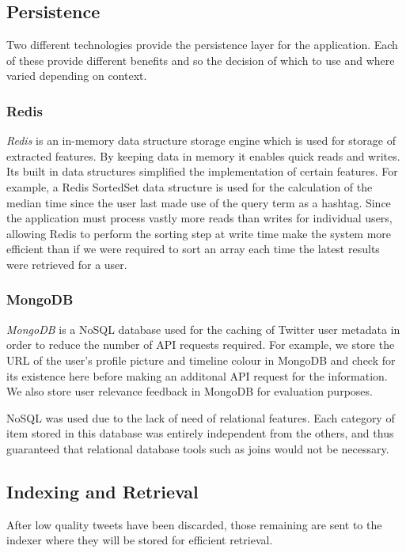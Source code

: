 \documentclass{l4proj}
\begin{document}
        \subsection{Persistence}
        
        Two different technologies provide the persistence layer for the application. Each of these provide different benefits and so the decision of which to use and where varied depending on context.
        
        \subsubsection{Redis}
        \textit{Redis} is an in-memory data structure storage engine which is used for storage of extracted features. By keeping data in memory it enables quick reads and writes. Its built in data structures simplified the implementation of certain features. For example, a Redis SortedSet data structure is used for the calculation of the median time since the user last made use of the query term as a hashtag. Since the application must process vastly more reads than writes for individual users, allowing Redis to perform the sorting step at write time make the system more efficient than if we were required to sort an array each time the latest results were retrieved for a user.
        
         \subsubsection{MongoDB}
         \textit{MongoDB} is a NoSQL database used for the caching of Twitter user metadata in order to reduce the number of API requests required. For example, we store the URL of the user's profile picture and timeline colour in MongoDB and check for its existence here before making an additonal API request for the information. We also store user relevance feedback in MongoDB for evaluation purposes.
         
         NoSQL was used due to the lack of need of relational features. Each category of item stored in this database was entirely independent from the others, and thus guaranteed that relational database tools such as joins would not be necessary.


        \subsection{Indexing and Retrieval}
        After low quality tweets have been discarded, those remaining are sent to the indexer where they will be stored for efficient retrieval. 
        
\end{document}
